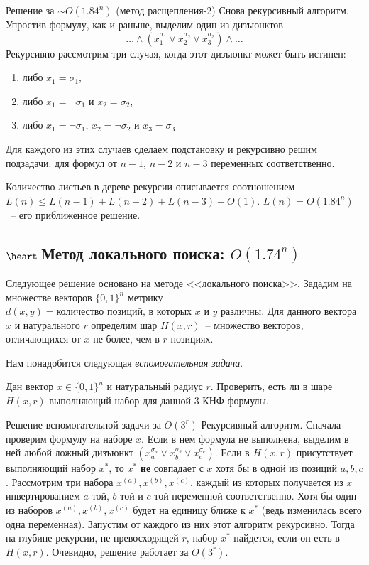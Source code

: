\begin{algodescription}{Решение за $\sim O(1.84^n)$ (метод расщепления-2)}
    Снова рекурсивный алгоритм. Упростив формулу, как и раньше, выделим один из дизъюнктов $$\ldots\land(x_1^{\sigma_1} \lor x_2^{\sigma_2} \lor x_3^{\sigma_3})\land\ldots$$ Рекурсивно рассмотрим три случая, когда этот дизъюнкт может быть истинен:
    \begin{enumerate}
    \item либо $x_1 = \sigma_1$,
    \item либо $x_1 = \neg\sigma_1$ и $x_2 = \sigma_2$,
    \item либо $x_1 = \neg\sigma_1$, $x_2 = \neg\sigma_2$ и $x_3 = \sigma_3$
    \end{enumerate}
    Для каждого из этих случаев сделаем подстановку и рекурсивно решим подзадачи: для формул от $n-1$, $n-2$ и $n-3$ переменных соответственно.
    
    Количество листьев в дереве рекурсии описывается соотношением $L(n) \le L(n-1) + L(n-2) + L(n-3) + O(1)$. $L(n) = O(1.84^n)$~-- его приближенное решение. 
\end{algodescription}

\subsection{$\heart~$Метод локального поиска: $O(1.74^n)$} \hypertarget{3satlocal}{}
Следующее решение основано на методе <<локального поиска>>. Зададим на множестве векторов $\{0, 1\}^n$ метрику $d(x, y) = \text{количество позиций, в которых } x \text{ и } y \text{ различны}$. Для данного вектора $x$ и натурального $r$ определим шар $H(x, r)$~-- множество векторов, отличающихся от $x$ не более, чем в $r$ позициях.

Нам понадобится следующая \hypertarget{flip20}{\textit{вспомогательная задача}}.

\begin{problem*}
    Дан вектор $x \in \{0, 1\}^n$ и натуральный радиус $r$. Проверить, есть ли в шаре $H(x, r)$ выполняющий набор для данной 3-КНФ формулы.
\end{problem*}

\begin{algodescription}{Решение вспомогательной задачи за $O(3^r)$}
    Рекурсивный алгоритм. Сначала проверим формулу на наборе $x$. Если в нем формула не выполнена, выделим в ней любой ложный дизъюнкт $(x_a^{\sigma_a} \lor x_b^{\sigma_b} \lor x_c^{\sigma_c})$. Если в $H(x, r)$ присутствует выполняющий набор $x^*$, то $x^*$ \textbf{не} совпадает с $x$ хотя бы в одной из позиций $a,b,c$. Рассмотрим три набора $x^{(a)}, x^{(b)}, x^{(c)}$, каждый из которых получается из $x$ инвертированием $a$-той, $b$-той и $c$-той переменной соответственно. Хотя бы один из наборов  $x^{(a)}, x^{(b)}, x^{(c)}$ будет на единицу ближе к $x^*$ (ведь изменилась всего одна переменная). Запустим от каждого из них этот алгоритм рекурсивно. Тогда на глубине рекурсии, не превосходящей $r$, набор $x^*$ найдется, если он есть в $H(x, r)$. Очевидно, решение работает за $O(3^r)$.
\end{algodescription}

